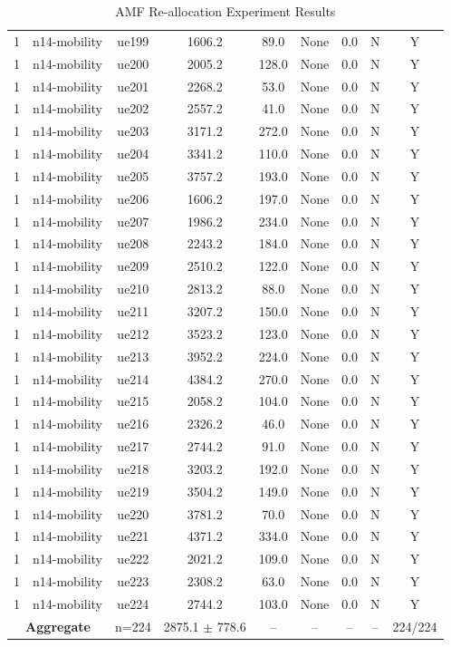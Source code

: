 \begin{table}[ht]
\begin{tabular}{|c|c|c|c|c|c|c|c|c|}
1 & n14-mobility & ue199 & 1606.2 & 89.0 & None & 0.0 & N & Y \\
1 & n14-mobility & ue200 & 2005.2 & 128.0 & None & 0.0 & N & Y \\
1 & n14-mobility & ue201 & 2268.2 & 53.0 & None & 0.0 & N & Y \\
1 & n14-mobility & ue202 & 2557.2 & 41.0 & None & 0.0 & N & Y \\
1 & n14-mobility & ue203 & 3171.2 & 272.0 & None & 0.0 & N & Y \\
1 & n14-mobility & ue204 & 3341.2 & 110.0 & None & 0.0 & N & Y \\
1 & n14-mobility & ue205 & 3757.2 & 193.0 & None & 0.0 & N & Y \\
1 & n14-mobility & ue206 & 1606.2 & 197.0 & None & 0.0 & N & Y \\
1 & n14-mobility & ue207 & 1986.2 & 234.0 & None & 0.0 & N & Y \\
1 & n14-mobility & ue208 & 2243.2 & 184.0 & None & 0.0 & N & Y \\
1 & n14-mobility & ue209 & 2510.2 & 122.0 & None & 0.0 & N & Y \\
1 & n14-mobility & ue210 & 2813.2 & 88.0 & None & 0.0 & N & Y \\
1 & n14-mobility & ue211 & 3207.2 & 150.0 & None & 0.0 & N & Y \\
1 & n14-mobility & ue212 & 3523.2 & 123.0 & None & 0.0 & N & Y \\
1 & n14-mobility & ue213 & 3952.2 & 224.0 & None & 0.0 & N & Y \\
1 & n14-mobility & ue214 & 4384.2 & 270.0 & None & 0.0 & N & Y \\
1 & n14-mobility & ue215 & 2058.2 & 104.0 & None & 0.0 & N & Y \\
1 & n14-mobility & ue216 & 2326.2 & 46.0 & None & 0.0 & N & Y \\
1 & n14-mobility & ue217 & 2744.2 & 91.0 & None & 0.0 & N & Y \\
1 & n14-mobility & ue218 & 3203.2 & 192.0 & None & 0.0 & N & Y \\
1 & n14-mobility & ue219 & 3504.2 & 149.0 & None & 0.0 & N & Y \\
1 & n14-mobility & ue220 & 3781.2 & 70.0 & None & 0.0 & N & Y \\
1 & n14-mobility & ue221 & 4371.2 & 334.0 & None & 0.0 & N & Y \\
1 & n14-mobility & ue222 & 2021.2 & 109.0 & None & 0.0 & N & Y \\
1 & n14-mobility & ue223 & 2308.2 & 63.0 & None & 0.0 & N & Y \\
1 & n14-mobility & ue224 & 2744.2 & 103.0 & None & 0.0 & N & Y \\
\multicolumn{2}{|c|}{\textbf{Aggregate}} & n=224 & 2875.1 $\pm$ 778.6 & -- & -- & -- & -- & 224/224 \\
\hline
\end{tabular}
\caption{AMF Re-allocation Experiment Results}
\label{tab:amf_realloc}
\end{table}
